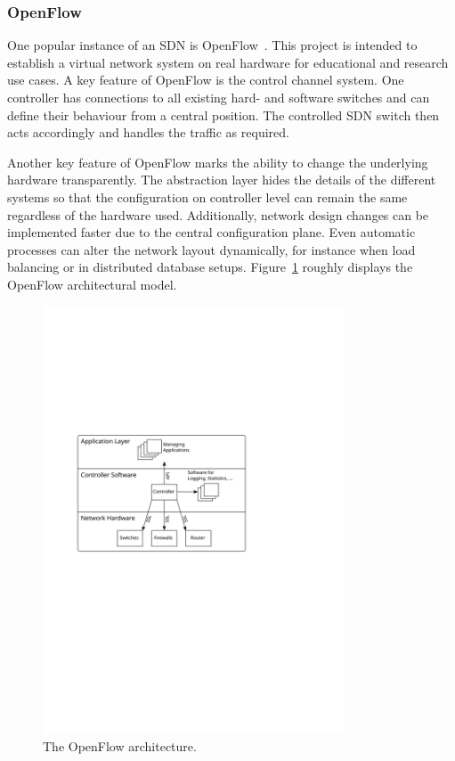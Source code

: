 \documentclass[a4paper,
		12pt,
		parskip=full,
		titlepage
		]{scrartcl}
\begin{document}
\subsubsection{OpenFlow}
One popular instance of an SDN is OpenFlow~\cite{openflow_spec10}.
This project is intended to establish a virtual network system on real hardware for educational and research use cases.
A key feature of OpenFlow is the control channel system.
One controller has connections to all existing hard- and software switches and can define their behaviour from a central position.
The controlled SDN switch then acts accordingly and handles the traffic as required.

Another key feature of OpenFlow marks the ability to change the underlying hardware transparently.
The abstraction layer hides the details of the different systems so that 
the configuration on controller level can remain the same regardless of the hardware used.
Additionally, network design changes can be implemented faster due to the central configuration plane.
Even automatic processes can alter the network layout dynamically, for instance when load balancing 
or in distributed database setups.
Figure~\ref{fig:openflow-arch} roughly displays the  OpenFlow architectural model.

\begin{figure}
\centering
\includegraphics[width=0.8\textwidth]{images/openflow-arch}
\caption{The OpenFlow architecture.}
\label{fig:openflow-arch}
\end{figure}
\end{document}
